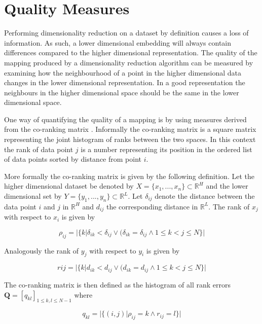 \section{Quality Measures}
\label{sec:quality-measures}
Performing dimensionality reduction on a dataset by definition causes a loss of information. As such, a lower dimensional embedding will always contain differences compared to the higher dimensional representation. The quality of the mapping produced by a dimensionality reduction algorithm can be measured by examining how the neighbourhood of a point in the higher dimensional data changes in the lower dimensional representation. In a good representation the neighbours in the higher dimensional space should be the same in the lower dimensional space.

One way of quantifying the quality of a mapping is by using measures derived from the co-ranking matrix \cite{lee2009quality}. Informally the co-ranking matrix is a square matrix representing the joint histogram of ranks between the two spaces. In this context the rank of data point $j$ is a number representing its position in the ordered list of data points sorted by distance from point $i$.

More formally the co-ranking matrix is given by the following definition. Let the higher dimensional dataset be denoted by $X = \{x_1, ..., x_n\} \subset \mathbb{R}^H$ and the lower dimensional set by $Y = \{y_1, ..., y_n\} \subset \mathbb{R}^L$. Let $\delta_{ij}$ denote the distance between the data point $i$ and $j$ in $\mathbb{R}^H$ and $d_{ij}$ the corresponding distance in $\mathbb{R}^L$. The rank of $x_j$ with respect to $x_i$ is given by

\begin{equation}
	\rho_{ij} = |\{k | \delta_{ik} < \delta_{ij} \lor (\delta_{ik} = \delta_{ij} \land 1 \leq k < j \leq N\}|
\end{equation}

Analogously the rank of $y_j$ with respect to $y_i$ is given by

\begin{equation}
	r{ij} = |\{k | d_{ik} < d_{ij} \lor (d_{ik} = d_{ij} \land 1 \leq k < j \leq N\}|
\end{equation}

The co-ranking matrix is then defined as the histogram of all rank errors $\bm{Q} = [q_{kl}]_{1 \leq k, l \leq N-1}$ where

\begin{equation}
	q_{kl} = |\{(i,j) | \rho_{ij} = k \land r_{ij} = l\}|
\end{equation}

